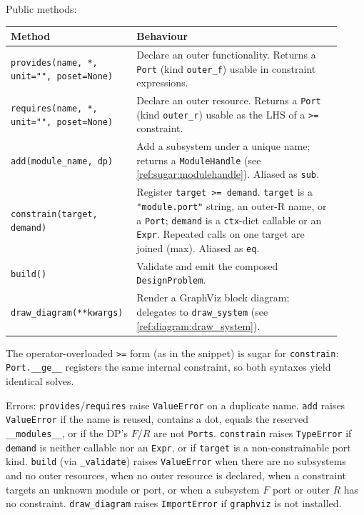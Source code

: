 \documentclass[11pt,a4paper]{article}
\begin{document}
Public methods:
\begin{center}
\begin{tabular}{@{}p{0.32\linewidth}p{0.60\linewidth}@{}}
\toprule
\textbf{Method} & \textbf{Behaviour} \\
\midrule
\texttt{provides(name, *, unit="", poset=None)} &
  Declare an outer functionality. Returns a \texttt{Port} (kind
  \texttt{outer\_f}) usable in constraint expressions. \\
\texttt{requires(name, *, unit="", poset=None)} &
  Declare an outer resource. Returns a \texttt{Port} (kind
  \texttt{outer\_r}) usable as the LHS of a \texttt{>=} constraint. \\
\texttt{add(module\_name, dp)} &
  Add a subsystem under a unique name; returns a \texttt{ModuleHandle}
  (see \ref{ref:sugar:modulehandle}). Aliased as \texttt{sub}. \\
\texttt{constrain(target, demand)} &
  Register \texttt{target >= demand}. \texttt{target} is a
  \texttt{"module.port"} string, an outer-R name, or a \texttt{Port};
  \texttt{demand} is a \texttt{ctx}-dict callable or an \texttt{Expr}.
  Repeated calls on one target are joined (max). Aliased as \texttt{eq}. \\
\texttt{build()} &
  Validate and emit the composed \texttt{DesignProblem}. \\
\texttt{draw\_diagram(**kwargs)} &
  Render a GraphViz block diagram; delegates to
  \texttt{draw\_system} (see \ref{ref:diagram:draw_system}). \\
\bottomrule
\end{tabular}
\end{center}

The operator-overloaded \texttt{>=} form (as in the snippet) is sugar for
\texttt{constrain}: \texttt{Port.\_\_ge\_\_} registers the same internal
constraint, so both syntaxes yield identical solves.

Errors: \texttt{provides}/\texttt{requires} raise \texttt{ValueError} on a
duplicate name. \texttt{add} raises \texttt{ValueError} if the name is
reused, contains a dot, equals the reserved \texttt{\_\_modules\_\_}, or if
the DP's $F$/$R$ are not \texttt{Ports}. \texttt{constrain} raises
\texttt{TypeError} if \texttt{demand} is neither callable nor an
\texttt{Expr}, or if \texttt{target} is a non-constrainable port kind.
\texttt{build} (via \texttt{\_validate}) raises \texttt{ValueError} when
there are no subsystems and no outer resources, when no outer resource is
declared, when a constraint targets an unknown module or port, or when a
subsystem $F$ port or outer $R$ has no constraint. \texttt{draw\_diagram}
raises \texttt{ImportError} if \texttt{graphviz} is not installed.
\end{document}
